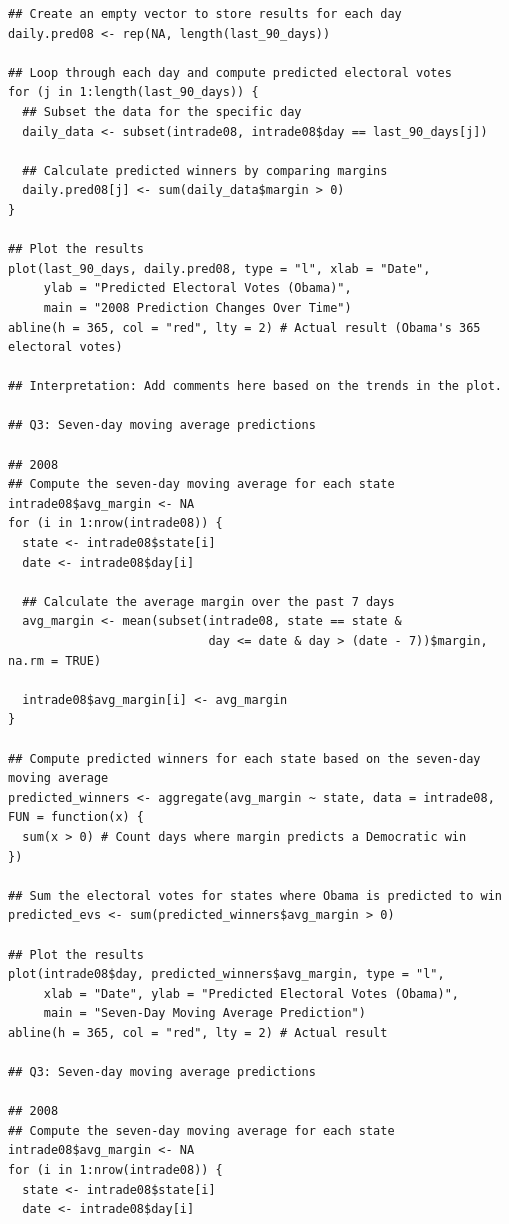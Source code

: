 \documentclass[12pt]{article}
\begin{document}
{\begin{verbatim}
## Create an empty vector to store results for each day
daily.pred08 <- rep(NA, length(last_90_days))

## Loop through each day and compute predicted electoral votes
for (j in 1:length(last_90_days)) {
  ## Subset the data for the specific day
  daily_data <- subset(intrade08, intrade08$day == last_90_days[j])
  
  ## Calculate predicted winners by comparing margins
  daily.pred08[j] <- sum(daily_data$margin > 0)
}

## Plot the results
plot(last_90_days, daily.pred08, type = "l", xlab = "Date", 
     ylab = "Predicted Electoral Votes (Obama)", 
     main = "2008 Prediction Changes Over Time")
abline(h = 365, col = "red", lty = 2) # Actual result (Obama's 365 electoral votes)

## Interpretation: Add comments here based on the trends in the plot.

## Q3: Seven-day moving average predictions

## 2008
## Compute the seven-day moving average for each state
intrade08$avg_margin <- NA
for (i in 1:nrow(intrade08)) {
  state <- intrade08$state[i]
  date <- intrade08$day[i]
  
  ## Calculate the average margin over the past 7 days
  avg_margin <- mean(subset(intrade08, state == state & 
                            day <= date & day > (date - 7))$margin, na.rm = TRUE)
  
  intrade08$avg_margin[i] <- avg_margin
}

## Compute predicted winners for each state based on the seven-day moving average
predicted_winners <- aggregate(avg_margin ~ state, data = intrade08, FUN = function(x) {
  sum(x > 0) # Count days where margin predicts a Democratic win
})

## Sum the electoral votes for states where Obama is predicted to win
predicted_evs <- sum(predicted_winners$avg_margin > 0)

## Plot the results
plot(intrade08$day, predicted_winners$avg_margin, type = "l",
     xlab = "Date", ylab = "Predicted Electoral Votes (Obama)",
     main = "Seven-Day Moving Average Prediction")
abline(h = 365, col = "red", lty = 2) # Actual result

## Q3: Seven-day moving average predictions

## 2008
## Compute the seven-day moving average for each state
intrade08$avg_margin <- NA
for (i in 1:nrow(intrade08)) {
  state <- intrade08$state[i]
  date <- intrade08$day[i]
  

\end{verbatim}}
\end{document}
